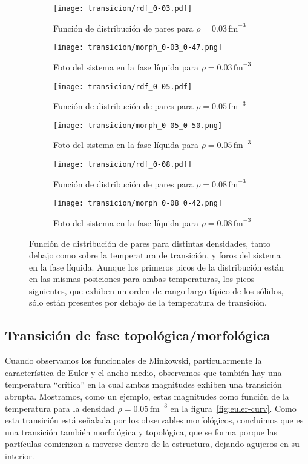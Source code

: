 \begin{figure}
  \centering
  \begin{subfigure}[h!]{0.4\columnwidth}
    \texttt{[image: transicion/rdf\_0-03.pdf]}
    \caption{Función de distribución de pares para $\rho=0.03\,\text{fm}^{-3}$}
  \end{subfigure}
  \begin{subfigure}[h!]{0.3\columnwidth}
    \texttt{[image: transicion/morph\_0-03\_0-47.png]}
    \caption{Foto del sistema en la fase líquida para $\rho=0.03\,\text{fm}^{-3}$}
  \end{subfigure}
  \begin{subfigure}[h!]{0.4\columnwidth}
    \texttt{[image: transicion/rdf\_0-05.pdf]}
    \caption{Función de distribución de pares para $\rho=0.05\,\text{fm}^{-3}$}
  \end{subfigure}
  \begin{subfigure}[h!]{0.3\columnwidth}
    \texttt{[image: transicion/morph\_0-05\_0-50.png]}
    \caption{Foto del sistema en la fase líquida para $\rho=0.05\,\text{fm}^{-3}$}
  \end{subfigure}
  \begin{subfigure}[h!]{0.4\columnwidth}
    \texttt{[image: transicion/rdf\_0-08.pdf]}
    \caption{Función de distribución de pares para $\rho=0.08\,\text{fm}^{-3}$}
  \end{subfigure}
  \begin{subfigure}[h!]{0.3\columnwidth}
    \texttt{[image: transicion/morph\_0-08\_0-42.png]}
    \caption{Foto del sistema en la fase líquida para $\rho=0.08\,\text{fm}^{-3}$}
  \end{subfigure}
  \caption{Función de distribución de pares para distintas densidades, tanto debajo como sobre la temperatura de transición, y foros del sistema en la fase líquida.
Aunque los primeros picos de la distribución están en las mismas posiciones para ambas temperaturas, los picos siguientes, que exhiben un orden de rango largo típico de los sólidos, sólo están presentes por debajo de la temperatura de transición.}
  \label{fig:rdf}
\end{figure}

\subsection{Transición de fase topológica/morfológica}
Cuando observamos los funcionales de Minkowski, particularmente la característica de Euler y el ancho medio, observamos que también hay una temperatura ``crítica'' en la cual ambas magnitudes exhiben una transición abrupta.
Mostramos, como un ejemplo, estas magnitudes como función de la temperatura para la densidad
$\rho=0.05\,\text{fm}^{-3}$ en la figura~\ref{fig:euler-curv}.
Como esta transición está señalada por los observables morfológicos, concluimos que es una transición también morfológica y topológica, que se forma porque las partículas comienzan a moverse dentro de la estructura, dejando agujeros en su interior.

